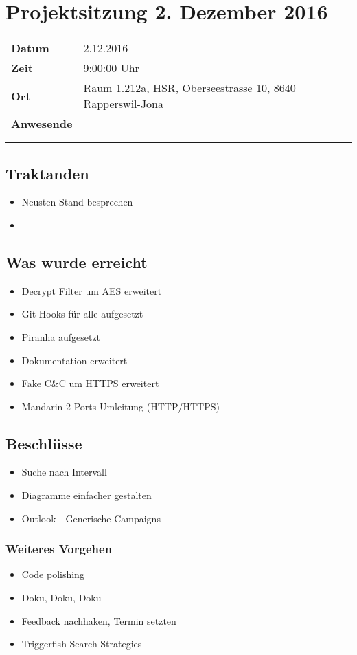 \documentclass[class=scrbook,crop=false]{standalone}
\begin{document}
	\section{Projektsitzung 2. Dezember 2016}

	\begin{tabular}{ll}
		\textbf{Datum} & 2.12.2016 \\
		\textbf{Zeit} & 9:00\textendash10:00 Uhr \\
		\textbf{Ort} & Raum 1.212a, HSR, Oberseestrasse 10, 8640 Rapperswil-Jona \\
		\textbf{Anwesende} & \ibuf \\ & \fbif \\ & \sadf
	\end{tabular}

	\subsection*{Traktanden}
	\begin{itemize}
		\item Neusten Stand besprechen
		\item 
	\end{itemize}

	\subsection*{Was wurde erreicht}
	\begin{itemize}
		\item Decrypt Filter um AES erweitert
		\item Git Hooks für alle aufgesetzt
		\item Piranha aufgesetzt
		\item Dokumentation erweitert
		\item Fake C\&C um HTTPS erweitert
		\item Mandarin 2 Ports Umleitung (HTTP/HTTPS)
	\end{itemize}

	\subsection*{Beschlüsse}
	\begin{itemize}
		\item Suche nach Intervall
		\item Diagramme einfacher gestalten
		\item Outlook - Generische Campaigns
	\end{itemize}

	\subsubsection*{Weiteres Vorgehen}
	\begin{itemize}
		\item Code polishing
		\item Doku, Doku, Doku
		\item Feedback nachhaken, Termin setzten
		\item Triggerfish Search Strategies
	\end{itemize}
\end{document}
